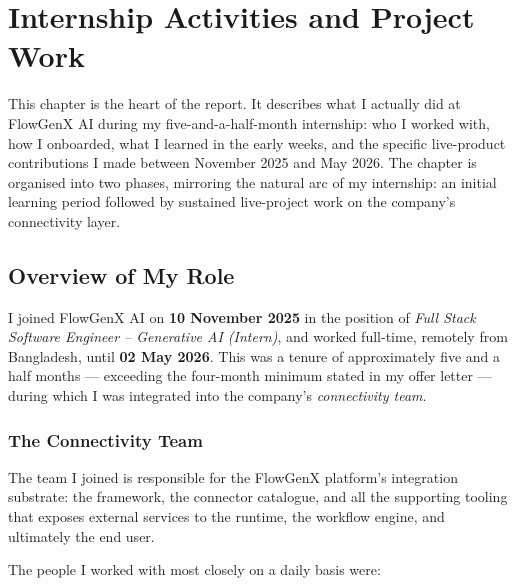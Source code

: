\chapter{Internship Activities and Project Work}
\label{ch:activities}

This chapter is the heart of the report. It describes what I actually
did at FlowGenX AI during my five-and-a-half-month internship: who I
worked with, how I onboarded, what I learned in the early weeks, and
the specific live-product contributions I made between November 2025
and May 2026. The chapter is organised into two phases, mirroring
the natural arc of my internship: an initial learning period followed
by sustained live-project work on the company's connectivity layer.

\section{Overview of My Role}
I joined FlowGenX AI on \textbf{10 November 2025} in the position of
\emph{Full Stack Software Engineer -- Generative AI (Intern)}, and
worked full-time, remotely from Bangladesh, until \textbf{02 May 2026}.
This was a tenure of approximately five and a half months ---
exceeding the four-month minimum stated in my offer letter --- during
which I was integrated into the company's \emph{connectivity team}.

\subsection{The Connectivity Team}
The team I joined is responsible for the FlowGenX platform's
integration substrate: the framework, the connector catalogue, and
all the supporting tooling that exposes external services to the
runtime, the workflow engine, and ultimately the end user.

The people I worked with most closely on a daily basis were:

